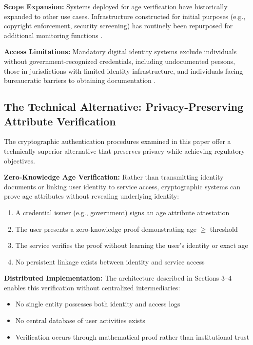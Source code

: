 \documentclass[11pt,a4paper]{article}
\begin{document}
\textbf{Scope Expansion:}
Systems deployed for age verification have historically expanded to other use cases. Infrastructure constructed for initial purposes (e.g., copyright enforcement, security screening) has routinely been repurposed for additional monitoring functions \citep{landau2011}.

\textbf{Access Limitations:}
Mandatory digital identity systems exclude individuals without government-recognized credentials, including undocumented persons, those in jurisdictions with limited identity infrastructure, and individuals facing bureaucratic barriers to obtaining documentation \citep{gelb2015}.

\subsection{The Technical Alternative: Privacy-Preserving Attribute Verification}

The cryptographic authentication procedures examined in this paper offer a technically superior alternative that preserves privacy while achieving regulatory objectives.

\textbf{Zero-Knowledge Age Verification:}
Rather than transmitting identity documents or linking user identity to service access, cryptographic systems can prove age attributes without revealing underlying identity:

\begin{enumerate}
    \item A credential issuer (e.g., government) signs an age attribute attestation
    \item The user presents a zero-knowledge proof demonstrating age $\geq$ threshold
    \item The service verifies the proof without learning the user's identity or exact age
    \item No persistent linkage exists between identity and service access
\end{enumerate}

\textbf{Distributed Implementation:}
The architecture described in Sections 3--4 enables this verification without centralized intermediaries:
\begin{itemize}[leftmargin=*]
    \item No single entity possesses both identity and access logs
    \item No central database of user activities exists
    \item Verification occurs through mathematical proof rather than institutional trust
\end{itemize}
\end{document}
